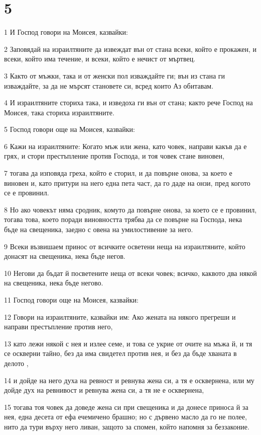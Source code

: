 \chapter{5}

\par 1 И Господ говори на Моисея, казвайки:
\par 2 Заповядай на израилтяните да извеждат вън от стана всеки, който е прокажен, и всеки, който има течение, и всеки, който е нечист от мъртвец.
\par 3 Както от мъжки, така и от женски пол изваждайте ги; вън из стана ги изваждайте, за да не мърсят становете си, всред които Аз обитавам.
\par 4 И израилтяните сториха така, и изведоха ги вън от стана; както рече Господ на Моисея, така сториха израилтяните.
\par 5 Господ говори още на Моисея, казвайки:
\par 6 Кажи на израилтяните: Когато мъж или жена, като човек, направи какъв да е грях, и стори престъпление против Господа, и тоя човек стане виновен,
\par 7 тогава да изповяда греха, който е сторил, и да повърне онова, за което е виновен и, като притури на него една пета част, да го даде на онзи, пред когото се е провинил.
\par 8 Но ако човекът няма сродник, комуто да повърне онова, за което се е провинил, тогава това, което поради виновността трябва да се повърне на Господа, нека бъде на свещеника, заедно с овена на умилостивение за него.
\par 9 Всеки възвишаем принос от всичките осветени неща на израилтяните, който донасят на свещеника, нека бъде негов.
\par 10 Негови да бъдат й посветените неща от всеки човек; всичко, каквото два някой на свещеника, нека бъде негово.
\par 11 Господ говори още на Моисея, казвайки:
\par 12 Говори на израилтяните, казвайки им: Ако жената на някого прегреши и направи престъпление против него,
\par 13 като лежи някой с нея и излее семе, и това се укрие от очите на мъжа й, и тя се оскверни тайно, без да има свидетел против нея, и без да бъде хваната в делото ,
\par 14 и дойде на него духа на ревност и ревнува жена си, а тя е осквернена, или му дойде дух на ревнивост и ревнува жена си, а тя не е осквернена,
\par 15 тогава тоя човек да доведе жена си при свещеника и да донесе приноса й за нея, една десета от ефа ечемичено брашно; но с дървено масло да го не полее, нито да тури върху него ливан, защото за спомен, който напомня за беззаконие.
